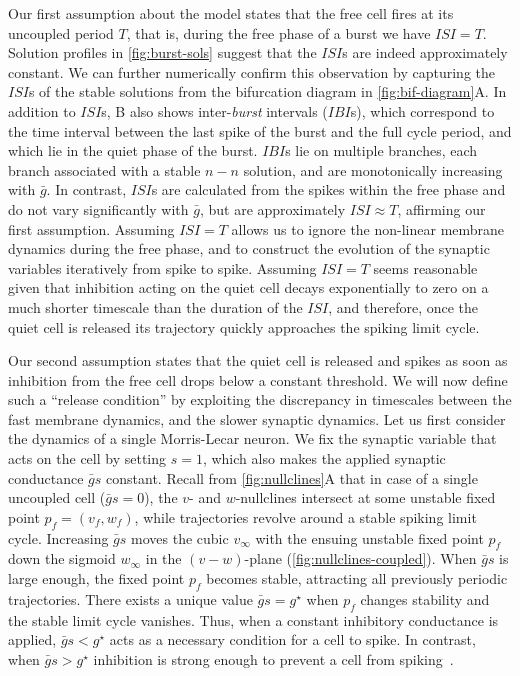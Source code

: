 \documentclass[utf8,draft]{frontiersFPHY} %
\newcommand{\gbar}{\bar g}
\begin{document}
Our first assumption about the model states that the free cell fires at its uncoupled period $T$, that is, during the free phase of a burst we have $ISI=T$.
Solution profiles in \cref{fig:burst-sols} suggest that the $ISI$s are indeed approximately constant.
We can further numerically confirm this observation by capturing the $ISI$s of the stable solutions from the bifurcation diagram in \cref{fig:bif-diagram}A.
In addition to $ISI$s, B also shows inter-\textit{burst} intervals ($IBI$s), which correspond to the time interval between the last spike of the burst and the full cycle period, and which lie in the quiet phase of the burst.
$IBI$s lie on multiple branches, each branch associated with a stable $n-n$ solution, and are monotonically increasing with $\gbar$.
In contrast, $ISI$s are calculated from the spikes within the free phase and do not vary significantly with $\gbar$, but are approximately $ISI\approx T$, affirming our first assumption.
Assuming $ISI=T$ allows us to ignore the non-linear membrane dynamics during the free phase, and to construct the evolution of the synaptic variables iteratively from spike to spike.
Assuming $ISI=T$ seems reasonable given that inhibition acting on the quiet cell decays exponentially to zero on a much shorter timescale than the duration of the $ISI$, and therefore, once the quiet cell is released its trajectory quickly approaches the spiking limit cycle.

Our second assumption states that the quiet cell is released and spikes as soon as inhibition from the free cell drops below a constant threshold.
We will now define such a ``release condition'' by exploiting the discrepancy in timescales between the fast membrane dynamics, and the slower synaptic dynamics.
Let us first consider the dynamics of a single Morris-Lecar neuron.
We fix the synaptic variable that acts on the cell by setting $s=1$, which also makes the applied synaptic conductance $\gbar s$ constant.
Recall from \cref{fig:nullclines}A that in case of a single uncoupled cell ($\gbar s=0$), the $v$- and $w$-nullclines intersect at some unstable fixed point $p_{f}=(v_{f},w_{f})$, while trajectories revolve around a stable spiking limit cycle.
Increasing $\gbar s$ moves the cubic $v_{\infty}$ with the ensuing unstable fixed point $p_{f}$ down the sigmoid $w_{\infty}$ in the $(v-w)$-plane (\cref{fig:nullclines-coupled}).
When $\gbar s$ is large enough, the fixed point $p_{f}$ becomes stable, attracting all previously periodic trajectories.
There exists a unique value $\gbar s=g^{\star}$ when $p_{f}$ changes stability and the stable limit cycle vanishes.
Thus, when a constant inhibitory conductance is applied, $\gbar s<g^{\star}$ acts as a necessary condition for a cell to spike.
In contrast, when $\gbar s>g^{\star}$ inhibition is strong enough to prevent a cell from spiking~\citep{bose2011}.
\end{document}
